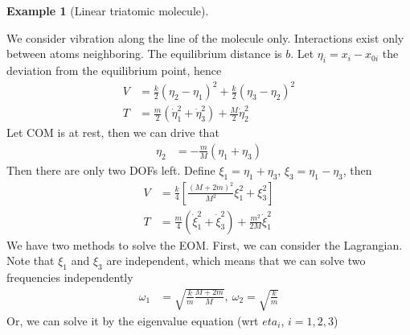 \documentclass[twoside,9pt]{article}
\numberwithin{equation}{section} %
\newcommand{\lms}{\fontfamily{lmss}\selectfont} %
\theoremstyle{definition}
\newtheorem{example}{\lms Example}[section]
\theoremstyle{remark}
\begin{document}
\begin{example}[Linear triatomic molecule]~
\tikzexternalenable
\begin{figure}[H]
    \centering
    \def\b{1}
    \def\h{0.14}
\end{figure}
\tikzexternaldisable
We consider vibration along the line of the molecule only.
Interactions exist only between atoms neighboring.
The equilibrium distance is $b$.
Let $\eta_i=x_i-x_{0i}$ the deviation from the equilibrium point,
hence
\begin{align*}
    V &= 
    \frac{k}{2}(\eta_2 - \eta_1)^2 + 
    \frac{k}{2}(\eta_3 - \eta_2)^2 \\
    T &= \frac{m}{2}(\dot\eta_1^2 + \dot\eta_3^2) + \frac{M}{2}\dot\eta_2^2
\end{align*}
Let COM is at rest, then we can drive that
\begin{align*}
    \eta_2 &= -\frac{m}{M}(\eta_1 + \eta_3)
\end{align*}
Then there are only two DOFs left.
Define $\xi_1 = \eta_1 + \eta_3$, $\xi_3 = \eta_1 - \eta_3$,
then
\begin{align*}
    V &= \frac{k}{4}\left[
        \frac{(M+2m)^2}{M^2}\xi_1^2 + \xi_3^2
    \right]\\
    T &= \frac{m}{4}(\dot\xi_1^2 + \dot\xi_3^2) + \frac{m^2}{2M}\dot\xi_1^2
\end{align*}
We have two methods to solve the EOM. 
First, we can consider the Lagrangian.
Note that $\xi_1$ and $\xi_3$ are independent,
which means that we can solve two frequencies independently
\begin{align*}
    \omega_1 &= \sqrt{\frac{k}{m}\frac{M+2m}{M}},~ 
    \omega_2  = \sqrt{\frac{k}{m}}
\end{align*}
Or, we can solve it by the eigenvalue equation (wrt $eta_i$, $i=1,2,3$)
\begin{align*}

\end{align*}
\end{example}
\end{document}
